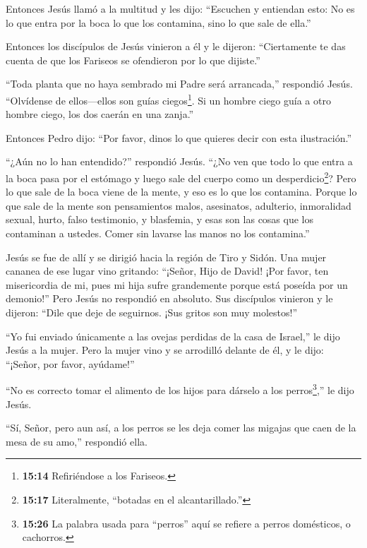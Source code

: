  Entonces Jesús llamó a la multitud y les dijo: ``Escuchen
y entiendan esto:  No es lo que entra por la boca lo que
los contamina, sino lo que sale de ella.''

 Entonces los discípulos de Jesús vinieron a él y le
dijeron: ``Ciertamente te das cuenta de que los Fariseos se ofendieron
por lo que dijiste.''

 ``Toda planta que no haya sembrado mi Padre será
arrancada,'' respondió Jesús.  ``Olvídense de ellos---ellos
son guías ciegos\footnote{\textbf{15:14} Refiriéndose a los Fariseos.}.
Si un hombre ciego guía a otro hombre ciego, los dos caerán en una
zanja.''

 Entonces Pedro dijo: ``Por favor, dinos lo que quieres
decir con esta ilustración.''

 ``¿Aún no lo han entendido?'' respondió Jesús.
 ``¿No ven que todo lo que entra a la boca pasa por el
estómago y luego sale del cuerpo como un desperdicio\footnote{\textbf{15:17}
  Literalmente, ``botadas en el alcantarillado.''}?  Pero
lo que sale de la boca viene de la mente, y eso es lo que los contamina.
 Porque lo que sale de la mente son pensamientos malos,
asesinatos, adulterio, inmoralidad sexual, hurto, falso testimonio, y
blasfemia,  y esas son las cosas que los contaminan a
ustedes. Comer sin lavarse las manos no los contamina.''

 Jesús se fue de allí y se dirigió hacia la región de Tiro
y Sidón.  Una mujer cananea de ese lugar vino gritando:
``¡Señor, Hijo de David! ¡Por favor, ten misericordia de mi, pues mi
hija sufre grandemente porque está poseída por un demonio!''
 Pero Jesús no respondió en absoluto. Sus discípulos
vinieron y le dijeron: ``Dile que deje de seguirnos. ¡Sus gritos son muy
molestos!''

 ``Yo fui enviado únicamente a las ovejas perdidas de la
casa de Israel,'' le dijo Jesús a la mujer.  Pero la mujer
vino y se arrodilló delante de él, y le dijo: ``¡Señor, por favor,
ayúdame!''

 ``No es correcto tomar el alimento de los hijos para
dárselo a los perros\footnote{\textbf{15:26} La palabra usada para
  ``perros'' aquí se refiere a perros domésticos, o cachorros.},'' le
dijo Jesús.

 ``Sí, Señor, pero aun así, a los perros se les deja comer
las migajas que caen de la mesa de su amo,'' respondió ella.

